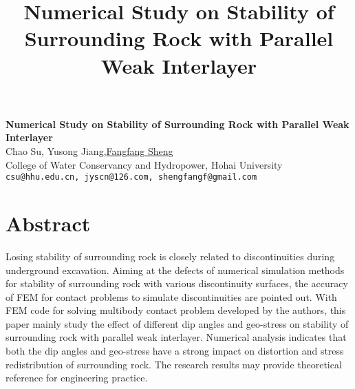 \title{Numerical Study on Stability of Surrounding Rock with Parallel Weak Interlayer}
\author{} \institute{}

\begin{center}

\textbf{\Large Numerical Study on Stability of Surrounding Rock with Parallel Weak Interlayer}\\
\vspace{10mm}
{\large Chao Su, Yusong Jiang,\underline{Fangfang Sheng}}\\
College of Water Conservancy and Hydropower, Hohai University\\
{\tt csu@hhu.edu.cn, jyscn@126.com, shengfangf@gmail.com}

\end{center}

\section*{Abstract}

Losing stability of surrounding rock is closely related to discontinuities during underground excavation. Aiming at the defects of numerical simulation methods for stability of surrounding rock with various discontinuity surfaces, the accuracy of FEM for contact problems to simulate discontinuities are pointed out. With FEM code for solving multibody contact problem developed by the authors, this paper mainly study the effect of different dip angles and geo-stress on stability of surrounding rock with parallel weak interlayer. Numerical analysis indicates that both the dip angles and geo-stress have a strong impact on distortion and stress redistribution of surrounding rock. The research results may provide theoretical reference for engineering practice.


